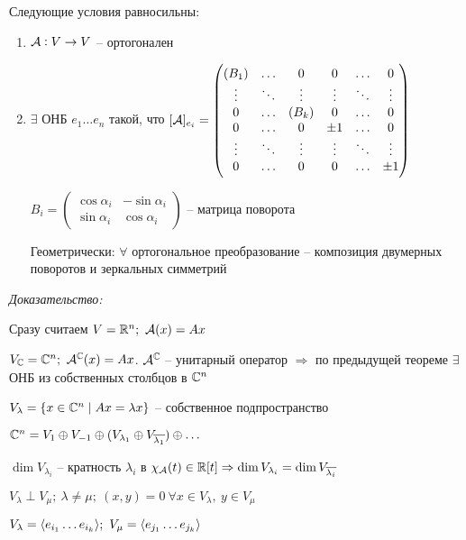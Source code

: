 \documentclass[12pt]{article}
\begin{document}
\begin{theo}{}
    Следующие условия равносильны:

    \begin{enumerate}
        \item $\mathcal{A} : V \to V$ -- ортогонален 
        \item $\exists$ ОНБ $e_1 \ldots e_n$ такой, что $[\mathcal{A}]_{e_i} = \begin{pmatrix}
            (B_1) & \ldots & 0 & 0 & \ldots & 0 \\
            \vdots & \ddots & \vdots & \vdots & \ddots & \vdots \\
            0 & \ldots & (B_k) & 0 & \ldots & 0 \\
            0 & \ldots & 0 & \pm 1 & \ldots & 0 \\
            \vdots & \ddots & \vdots & \vdots & \ddots & \vdots \\
            0 & \ldots & 0 & 0 & \ldots & \pm 1
        \end{pmatrix}$

        $B_i = \begin{pmatrix}
            \cos \alpha_i & -\sin \alpha_i \\
            \sin \alpha_i & \cos \alpha_i
        \end{pmatrix}$ -- матрица поворота 

        Геометрически: $\forall$ ортогональное преобразование -- композиция двумерных поворотов и зеркальных симметрий
    \end{enumerate}
\end{theo}

\textit{Доказательство:}

Сразу считаем $V = \mathbb R^n;\ \mathcal{A}(x) = Ax$

$V_{\mathbb C} = \mathbb C^n;\ \mathcal{A}^{\mathbb C}(x) = Ax$. $\mathcal{A}^{\mathbb C}$ -- унитарный оператор $\Rightarrow$ по предыдущей теореме $\exists$ ОНБ из собственных столбцов в $\mathbb C^n$

$V_\lambda = \{ x \in \mathbb C^n \mid Ax = \lambda x \}$ -- собственное подпространство 

$\mathbb C^n = V_1 \oplus V_{-1} \oplus (V_{\lambda_1} \oplus V_{\overline{\lambda_1}}) \oplus \ldots$

$\dim V_{\lambda_i}$ -- кратность $\lambda_i$ в $\chi_{\mathcal{A}}(t) \in \mathbb R[t] \Rightarrow \dim V_{\lambda_i} = \dim V_{\overline{\lambda_i}}$

$V_\lambda \perp V_\mu;\ \lambda \neq \mu;\ (x, y) = 0\ \forall x \in V_\lambda,\ y \in V_\mu$

$V_\lambda = \q{e_{i_1} \ldots e_{i_k}};\ V_\mu = \q{e_{j_1} \ldots e_{j_k}}$
\end{document}
